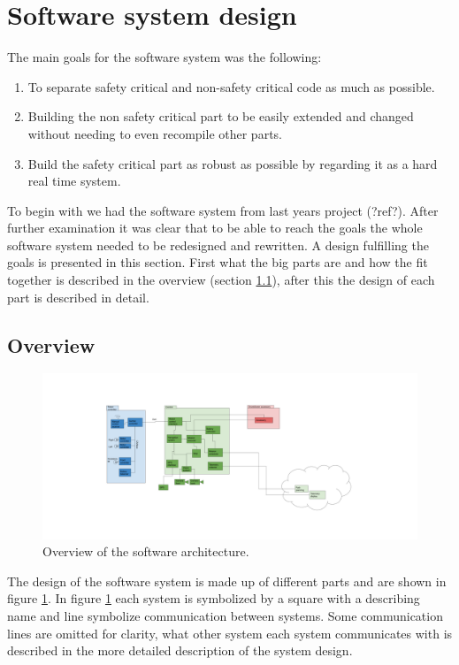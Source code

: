 \documentclass[main.tex]{subfiles}
\begin{document}
\section{Software system design}

The main goals for the software system was the following:
\begin{enumerate}
    \item To separate safety critical and non-safety critical code as much as possible.
    \item Building the non safety critical part to be easily extended and changed without needing to even recompile other parts.
    \item Build the safety critical part as robust as possible by regarding it as a hard real time system.
\end{enumerate}


To begin with we had the software system from last years project (?ref?).
After further examination it was clear that to be able to reach the goals the whole software system
needed to be redesigned and rewritten. A design fulfilling the goals is presented in this section.
First what the big parts are and how the fit together is described in the overview (section \ref{sec:sw_design_overview}),
after this the design of each part is described in detail.

\subsection{Overview}
\label{sec:sw_design_overview}

\begin{figure}
    \includegraphics[width=\textwidth]{software_overview.png}
    \caption{Overview of the software architecture.}
    \label{fig:software_overview}
\end{figure}

The design of the software system is made up of different parts and are shown in figure \ref{fig:software_overview}. 
In figure \ref{fig:software_overview} each system is symbolized by a square with a describing name and
line symbolize communication between systems. Some communication lines are omitted for clarity,
what other system each system communicates with is described in the more detailed description of the system design.
\end{document}
